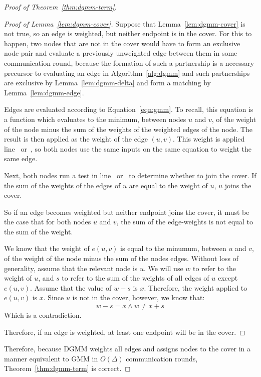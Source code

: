 \begin{proof}[Proof of Theorem~\ref{thm:dgmm-term}]
\begin{proof}[Proof of Lemma~\ref{lem:dgmm-cover}]
  Suppose that Lemma~\ref{lem:dgmm-cover} is not true, so an edge is weighted, but neither endpoint is in the cover. For this to happen, two nodes that are not in the cover would have to form an exclusive node pair and evaluate a previously unweighted edge between them in some communication round, because the formation of such a partnership is a necessary precursor to evaluating an edge in Algorithm~\ref{alg:dgmm} and such partnerships are exclusive by Lemma~\ref{lem:dgmm-delta} and form a matching by Lemma~\ref{lem:dgmm-edge}. 

  Edges are evaluated according to Equation~\ref{eqn:gmm}. To recall, this equation is a function which evaluates to the minimum, between nodes $u$ and $v$, of the weight of the node minus the sum of the weights of the weighted edges of the node. The result is then applied as the weight of the edge $(u,v)$. This weight is applied line~ or~, so both nodes use the same inputs on the same equation to weight the same edge.

  Next, both nodes run a test in line~ or~ to determine whether to join the cover. If the sum of the weights of the edges of $u$ are equal to the weight of $u$, $u$ joins the cover.

  So if an edge becomes weighted but neither endpoint joins the cover, it must be the case that for both nodes $u$ and $v$, the sum of the edge-weights is not equal to the sum of the weight.

  We know that the weight of $e(u,v)$ is equal to the minumum, between $u$ and $v$, of the weight of the node minus the sum of the nodes edges. Without loss of generality, assume that the relevant node is $u$. We will use $w$ to refer to the weight of $u$, and $s$ to refer to the sum of the weights of all edges of $u$ except $e(u,v)$. Assume that the value of $w - s$ is $x$. Therefore, the weight applied to $e(u,v)$ is $x$. Since $u$ is not in the cover, however, we know that: 
\begin{equation*}
w-s = x \land w \ne x+s
\end{equation*}
Which is a contradiction.

Therefore, if an edge is weighted, at least one endpoint will be in the cover.
\end{proof}

Therefore, because DGMM weights all edges and assigns nodes to the cover in a manner equivalent to GMM in $O(\Delta)$ communication rounds, Theorem~\ref{thm:dgmm-term} is correct.
\end{proof}
